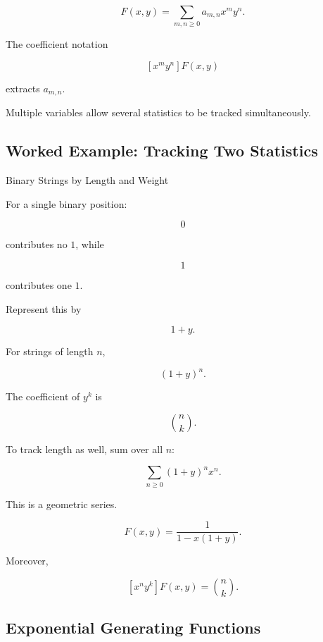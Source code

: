 \[
\boxed{
F(x,y)
=
\sum_{m,n\geq0}
a_{m,n}x^my^n.
}
\]

The coefficient notation

\[
[x^my^n]F(x,y)
\]

extracts \(a_{m,n}\).

Multiple variables allow several statistics to be tracked
simultaneously.

\subsection{Worked Example: Tracking Two Statistics}
\label{subsec:worked-bivariate-gf}

\begin{workedexamplebox}{Binary Strings by Length and Weight}

For a single binary position:

\[
0
\]

contributes no \(1\), while

\[
1
\]

contributes one \(1\).

Represent this by

\[
1+y.
\]

For strings of length \(n\),

\[
(1+y)^n.
\]

The coefficient of \(y^k\) is

\[
\binom{n}{k}.
\]

To track length as well, sum over all \(n\):

\[
\sum_{n\geq0}(1+y)^nx^n.
\]

This is a geometric series.

\begin{answerbox}
\[
\boxed{
F(x,y)
=
\frac{1}{1-x(1+y)}.
}
\]

Moreover,

\[
\boxed{
[x^ny^k]F(x,y)
=
\binom{n}{k}.
}
\]
\end{answerbox}

\end{workedexamplebox}

\subsection{Exponential Generating Functions}
\label{subsec:exponential-generating-functions}

